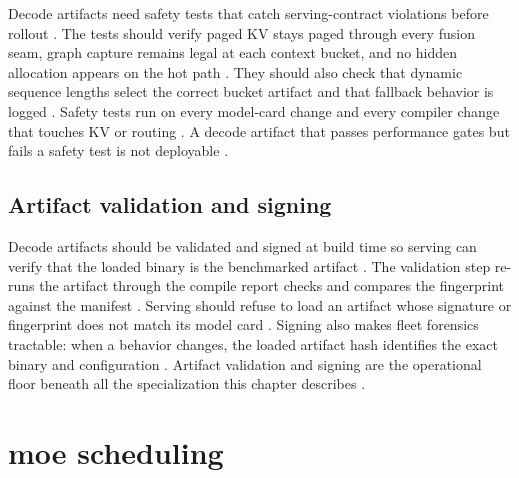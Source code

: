 Decode artifacts need safety tests that catch serving-contract violations before rollout \citep{chen2020compilerbasedhardw,memoryfloor2026,patel2025llminference}. The tests should verify paged KV stays paged through every fusion seam, graph capture remains legal at each context bucket, and no hidden allocation appears on the hot path \citep{kwon2023vllm,nvidia2024cudagraphs,taxbreak2026}. They should also check that dynamic sequence lengths select the correct bucket artifact and that fallback behavior is logged \citep{patel2025llminference,memoryfloor2026}. Safety tests run on every model-card change and every compiler change that touches KV or routing \citep{chen2020compilerbasedhardw,memoryfloor2026}. A decode artifact that passes performance gates but fails a safety test is not deployable \citep{patel2025llminference,taxbreak2026}.

\subsection{Artifact validation and signing}

Decode artifacts should be validated and signed at build time so serving can verify that the loaded binary is the benchmarked artifact \citep{chen2020compilerbasedhardw,memoryfloor2026,patel2025llminference}. The validation step re-runs the artifact through the compile report checks and compares the fingerprint against the manifest \citep{memoryfloor2026,taxbreak2026}. Serving should refuse to load an artifact whose signature or fingerprint does not match its model card \citep{chen2020compilerbasedhardw,patel2025llminference}. Signing also makes fleet forensics tractable: when a behavior changes, the loaded artifact hash identifies the exact binary and configuration \citep{memoryfloor2026,patel2025llminference}. Artifact validation and signing are the operational floor beneath all the specialization this chapter describes \citep{chen2020compilerbasedhardw,taxbreak2026}.

\section{moe scheduling}
\label{sec:ch23_moe_scheduling}


